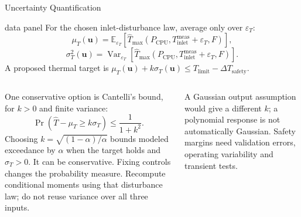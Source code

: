\begin{frame}{Uncertainty Quantification}
  \begin{beamercolorbox}[sep=2mm,wd=\textwidth]{data panel}
    \footnotesize
    For the chosen inlet-disturbance law, average only over $\varepsilon_T$:
    \[
      \mu_T(\mathbf u)=\mathbb E_{\varepsilon_T}
        [\widehat T_{\max}(P_{\mathrm{CPU}},T_{\mathrm{inlet}}^{\mathrm{meas}}+\varepsilon_T,F)],
    \]
    \[
      \sigma_T^2(\mathbf u)=\operatorname{Var}_{\varepsilon_T}
        [\widehat T_{\max}(P_{\mathrm{CPU}},T_{\mathrm{inlet}}^{\mathrm{meas}}+\varepsilon_T,F)].
    \]
    A proposed thermal target is
    $\mu_T(\mathbf u)+k\sigma_T(\mathbf u)\leq T_{\mathrm{limit}}-\Delta T_{\mathrm{safety}}$.
  \end{beamercolorbox}
  \medskip
  \begin{columns}[T,onlytextwidth]
      \footnotesize
      One conservative option is Cantelli's bound, for $k>0$ and finite variance:
      \[
        \Pr(\widehat T-\mu_T\geq k\sigma_T)\leq\frac{1}{1+k^2}.
      \]
      Choosing $k=\sqrt{(1-\alpha)/\alpha}$ bounds modeled exceedance by $\alpha$
      when the target holds and $\sigma_T>0$. It can be conservative.
      \footnotesize
      Fixing controls changes the probability measure. Recompute conditional
      moments using that disturbance law; do not reuse variance over all three inputs.\par
      \smallskip
      A Gaussian output assumption would give a different $k$; a polynomial
      response is not automatically Gaussian. Safety margins need validation
      errors, operating variability and transient tests.
  \end{columns}
\end{frame}
